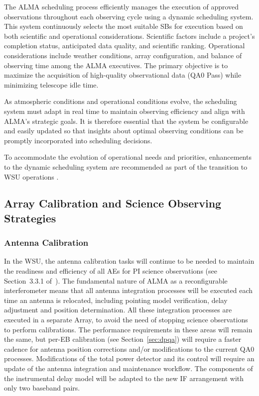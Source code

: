 The ALMA scheduling process efficiently manages the execution of approved observations throughout each observing cycle using a dynamic scheduling system.  This system continuously selects the most suitable \acp{SB} for execution based on both scientific and operational considerations. Scientific factors include a project's completion status, anticipated data quality, and scientific ranking. Operational considerations include weather conditions, array configuration, and balance of observing time among the ALMA executives. The primary objective is to maximize the acquisition of high-quality observational data (QA0 Pass) while minimizing telescope idle time.

As atmospheric conditions and operational conditions evolve, the scheduling system must adapt in real time to maintain observing efficiency and align with ALMA's strategic goals. It is therefore essential that the system be configurable and easily updated so that insights about optimal observing conditions can be promptly incorporated into scheduling decisions.

To accommodate the evolution of operational needs and priorities, enhancements to the dynamic scheduling system are recommended as part of the transition to WSU operations \cite{TWO}.


\subsection{Array Calibration and Science Observing Strategies}
\label{sec:calibrations}



\subsubsection{Antenna Calibration}
\label{sec:ant_calib}

In the WSU, the antenna calibration tasks will continue to be needed to maintain the readiness and efficiency of all AEs for PI science observations (see Section~3.3.1 of~\cite{CSA-IA}).  The fundamental nature of ALMA as a reconfigurable interferometer means that all antenna integration processes will be executed each time an antenna is relocated, including pointing model verification, delay adjustment and position determination. All these integration processes are executed in a separate Array, to avoid the need of stopping science observations to perform calibrations. The performance requirements in these areas will remain the same, but per-EB calibration (see Section~\ref{sec:dpqa}) will require a faster cadence for antenna position corrections and/or modifications to the current QA0 processes. Modifications of the total power detector and its control will require an update of the antenna integration and maintenance workflow. The components of the instrumental delay model will be adapted to the new IF arrangement with only two baseband pairs.  

